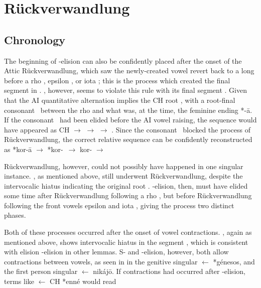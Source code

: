 \section{R\"uckverwandlung}\label{sec:Ruck}

\subsection{}\label{subsec:Plaus2}

\subsection{Chronology}\label{subsec:Chronology}
\label{para:Ruck1}
The beginning of \w-elision can also be confidently placed after
the onset of the Attic R\"uckverwandlung, which saw the newly-created
vowel \ipa{\ae:} revert back to a long  before a rho ,
epsilon , or iota ; this is the process which
created the final segment  in . , however, seems to
violate this rule with its final segment . Given that the AI
quantitative alternation implies the CH root , with a root-final
consonant \w\ between the rho  and what was, at the time,
the feminine ending *-\={a}. If the consonant \w\ had been elided before the AI
vowel raising, the sequence would have appeared as CH  $\to$
 $\to$  $\to$ . Since the consonant \w\ blocked the
process of R\"uckverwandlung, the correct relative sequence can be
confidently reconstructed as *kor\w-\=a $\to$ *kor\w-\ash\ $\to$ kor\w-
$\to$  

\label{para:Ruck2}
R\"uckverwandlung, however, could not possibly have happened in one
singular instance. , as mentioned above, still underwent
R\"uckverwandlung, despite the intervocalic hiatus indicating the
original root . \W-elision, then, must have elided some time
after R\"uckverwandlung following a rho , but before R\"uckverwandlung
following the front vowels epsilon  and iota ,
giving the process two distinct phases.

\label{para:Contr}
Both of these processes occurred after the onset of vowel contractions.
, again as mentioned above, shows intervocalic hiatus in the segment
, which is consistent with elision \w-elision in other lemmas.
S- and \textel{\yod}-elision, however, both allow contractions between vowels, as seen in
in the genitive singular  $\gets$ *g\'enesos,\autocite[172]{Sihler_1995}
and the first person singular  $\gets$ nik\'aj\=o.
If contractions had occurred after \w-elision, terms like  $\gets$ CH *enn\'e\w\textel{\shwa}
would read 